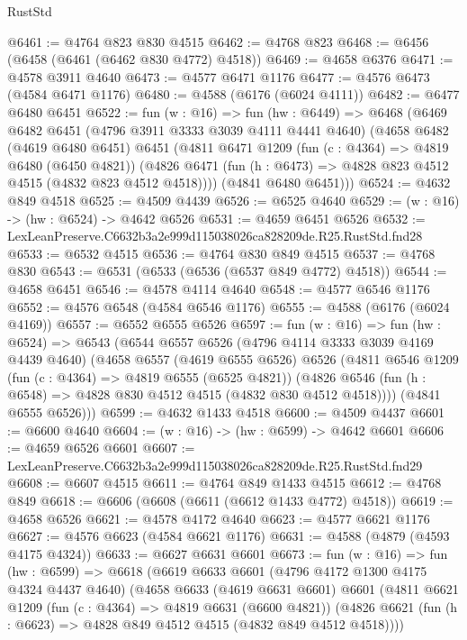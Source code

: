 \begin{lexlean}{RustStd}
\begin{coremodule}
@6461 := @4764 @823 @830 @4515
@6462 := @4768 @823
@6468 := @6456 (@6458 (@6461 (@6462 @830 @4772) @4518))
@6469 := @4658 @6376
@6471 := @4578 @3911 @4640
@6473 := @4577 @6471 @1176
@6477 := @4576 @6473 (@4584 @6471 @1176)
@6480 := @4588 (@6176 (@6024 @4111))
@6482 := @6477 @6480 @6451
@6522 := fun (w : @16) =>
  fun (hw : @6449) =>
  @6468
    (@6469
      @6482
      @6451
      (@4796 @3911 @3333 @3039 @4111 @4441 @4640)
      (@4658
        @6482
        (@4619 @6480 @6451)
        @6451
        (@4811
          @6471
          @1209
          (fun (c : @4364) => @4819 @6480 (@6450 @4821))
          (@4826 @6471 (fun (h : @6473) => @4828 @823 @4512 @4515 (@4832 @823 @4512 @4518))))
        (@4841 @6480 @6451)))
@6524 := @4632 @849 @4518
@6525 := @4509 @4439
@6526 := @6525 @4640
@6529 := (w : @16) -> (hw : @6524) -> @4642 @6526
@6531 := @4659 @6451 @6526
@6532 := LexLeanPreserve.C6632b3a2e999d115038026ca828209de.R25.RustStd.fnd28
@6533 := @6532 @4515
@6536 := @4764 @830 @849 @4515
@6537 := @4768 @830
@6543 := @6531 (@6533 (@6536 (@6537 @849 @4772) @4518))
@6544 := @4658 @6451
@6546 := @4578 @4114 @4640
@6548 := @4577 @6546 @1176
@6552 := @4576 @6548 (@4584 @6546 @1176)
@6555 := @4588 (@6176 (@6024 @4169))
@6557 := @6552 @6555 @6526
@6597 := fun (w : @16) =>
  fun (hw : @6524) =>
  @6543
    (@6544
      @6557
      @6526
      (@4796 @4114 @3333 @3039 @4169 @4439 @4640)
      (@4658
        @6557
        (@4619 @6555 @6526)
        @6526
        (@4811
          @6546
          @1209
          (fun (c : @4364) => @4819 @6555 (@6525 @4821))
          (@4826 @6546 (fun (h : @6548) => @4828 @830 @4512 @4515 (@4832 @830 @4512 @4518))))
        (@4841 @6555 @6526)))
@6599 := @4632 @1433 @4518
@6600 := @4509 @4437
@6601 := @6600 @4640
@6604 := (w : @16) -> (hw : @6599) -> @4642 @6601
@6606 := @4659 @6526 @6601
@6607 := LexLeanPreserve.C6632b3a2e999d115038026ca828209de.R25.RustStd.fnd29
@6608 := @6607 @4515
@6611 := @4764 @849 @1433 @4515
@6612 := @4768 @849
@6618 := @6606 (@6608 (@6611 (@6612 @1433 @4772) @4518))
@6619 := @4658 @6526
@6621 := @4578 @4172 @4640
@6623 := @4577 @6621 @1176
@6627 := @4576 @6623 (@4584 @6621 @1176)
@6631 := @4588 (@4879 (@4593 @4175 @4324))
@6633 := @6627 @6631 @6601
@6673 := fun (w : @16) =>
  fun (hw : @6599) =>
  @6618
    (@6619
      @6633
      @6601
      (@4796 @4172 @1300 @4175 @4324 @4437 @4640)
      (@4658
        @6633
        (@4619 @6631 @6601)
        @6601
        (@4811
          @6621
          @1209
          (fun (c : @4364) => @4819 @6631 (@6600 @4821))
          (@4826 @6621 (fun (h : @6623) => @4828 @849 @4512 @4515 (@4832 @849 @4512 @4518))))

\end{coremodule}
\end{lexlean}
